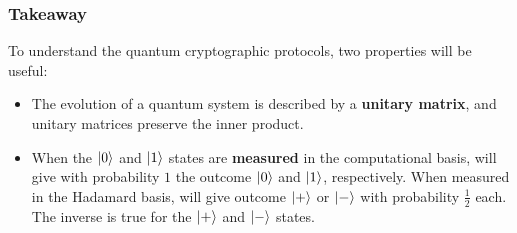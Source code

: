 \documentclass{beamer}
\newcommand{\kz}{\ket{0}}
\newcommand{\ko}{\ket{1}}
\newcommand{\kpl}{\ket{+}}
\newcommand{\km}{\ket{-}}
\newcommand{\oost}{\frac{1}{\sqrt{2}}}
\begin{document}
%
%
%

\begin{frame}%
\frametitle{Takeaway}

To understand the quantum cryptographic protocols, two properties will be useful:
\begin{itemize}
\item The evolution of a quantum system is described by  a \textbf{unitary matrix}, and unitary matrices preserve the inner product. 
\item When the $\kz$ and $\ko$ states are \textbf{measured} in the computational basis, will give with probability $1$ the outcome $\kz$ and $\ko$, respectively. When measured in the Hadamard basis, will give outcome $\kpl$ or $\km$ with probability $\frac{1}{2}$ each. The inverse is true for the $\kpl$ and $\km$ states.
\end{itemize}

\end{frame}
\end{document}
